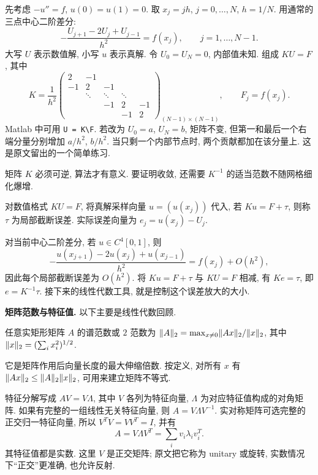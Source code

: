 先考虑 $-u''=f$, $u(0)=u(1)=0$. 取 $x_j=jh$, $j=0,\ldots,N$, $h=1/N$. 用通常的三点中心二阶差分:
\begin{equation}\label{eq:dirichlet-fd}
-\frac{U_{j+1}-2U_j+U_{j-1}}{h^2}=f(x_j),\qquad j=1,\ldots,N-1.
\end{equation}
大写 $U$ 表示数值解, 小写 $u$ 表示真解. 令 $U_0=U_N=0$, 内部值未知. 组成 $KU=F$, 其中
\[
K=\frac1{h^2}\begin{pmatrix}
2&-1&&&\\-1&2&-1&&\\&\ddots&\ddots&\ddots&\\&&-1&2&-1\\&&&-1&2
\end{pmatrix}_{(N-1)\times(N-1)},\qquad F_j=f(x_j).
\]
Matlab 中可用 \texttt{U = K\textbackslash F}. 若改为 $U_0=a$, $U_N=b$, 矩阵不变, 但第一和最后一个右端分量分别增加 $a/h^2$, $b/h^2$. 当只剩一个内部节点时, 两个贡献都加在该分量上. 这是原文留出的一个简单练习.

矩阵 $K$ 必须可逆, 算法才有意义. 要证明收敛, 还需要 $K^{-1}$ 的适当范数不随网格细化爆增.

\begin{definition}[局部截断误差与实际误差]\label{def:bvp-errors}
对数值格式 $KU=F$, 将真解采样向量 $u=(u(x_j))$ 代入, 若 $Ku=F+\tau$, 则称 $\tau$ 为局部截断误差. 实际误差向量为 $e_j=u(x_j)-U_j$.
\end{definition}

对当前中心二阶差分, 若 $u\in C^4[0,1]$, 则
\[
-\frac{u(x_{j+1})-2u(x_j)+u(x_{j-1})}{h^2}=f(x_j)+O(h^2),
\]
因此每个局部截断误差为 $O(h^2)$. 将 $Ku=F+\tau$ 与 $KU=F$ 相减, 有 $Ke=\tau$, 即 $e=K^{-1}\tau$. 接下来的线性代数工具, 就是控制这个误差放大的大小.

\textbf{矩阵范数与特征值.} 以下主要是线性代数回顾.

\begin{definition}\label{def:spectral-norm}
任意实矩形矩阵 $A$ 的谱范数或 $2$ 范数为 $\lVert A\rVert_2=\max_{x\neq0}\lVert Ax\rVert_2/\lVert x\rVert_2$, 其中 $\lVert x\rVert_2=(\sum_ix_i^2)^{1/2}$.
\end{definition}
它是矩阵作用后向量长度的最大伸缩倍数. 按定义, 对所有 $x$ 有 $\lVert Ax\rVert_2\leq\lVert A\rVert_2\lVert x\rVert_2$, 可用来建立矩阵不等式.

特征分解写成 $AV=V\Lambda$, 其中 $V$ 各列为特征向量, $\Lambda$ 为对应特征值构成的对角矩阵. 如果有完整的一组线性无关特征向量, 则 $A=V\Lambda V^{-1}$. 实对称矩阵可选完整的正交归一特征向量, 所以 $V^TV=VV^T=I$, 并有
\[
A=V\Lambda V^T=\sum_iv_i\lambda_i v_i^T.
\]
其特征值都是实数. 这里 $V$ 是正交矩阵; 原文把它称为 unitary 或旋转, 实数情况下“正交”更准确, 也允许反射.

